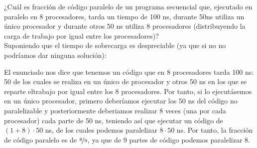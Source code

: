 \begin{ejercicio}
    ¿Cuál es fracción de código paralelo de un programa secuencial que, ejecutado en paralelo en 8
    procesadores, tarda un tiempo de 100 ns, durante 50ns utiliza un único procesador y durante otros 50 ns
    utiliza 8 procesadores (distribuyendo la carga de trabajo por igual entre los procesadores)?\\

    Suponiendo que el tiempo de sobrecarga es despreciable (ya que si no no podríamos dar ninguna solución):

    El enunciado nos dice que tenemos un código que en 8 procesadores tarda 100 ns: 50 de los cuales se realiza en un único de procesador y otros 50 ns en los que se reparte eltrabajo por igual entre los 8 procesadores. Por tanto, si lo ejecutásemos en un único procesador, primero deberíamos ejecutar los 50 ns del código no paralelizable y posteriormente deberiamos realizar 8 veces (una por cada procesador) cada parte de 50 ns, teniendo así que ejecutar un código de $(1 + 8)\cdot 50$ ns, de los cuales podemos paralelizar $8\cdot 50$ ns. Por tanto, la fracción de código paralelo es de $\nicefrac{8}{9}$, ya que de 9 partes de código podemos paralelizar 8.
\end{ejercicio}

